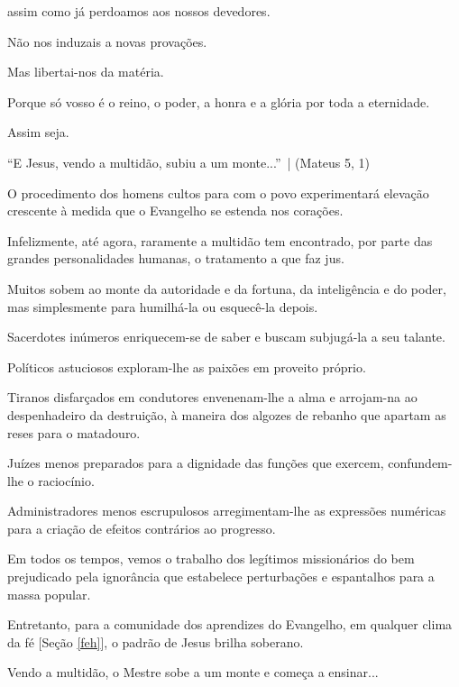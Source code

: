 \documentclass[12pt,a4paper]{article}
\begin{document}
			assim como j\'a perdoamos aos nossos devedores.

			N\~ao nos induzais a novas prova\c{c}\~oes.

			Mas libertai-nos da mat\'eria.

			Porque s\'o vosso \'e o reino, o poder, a honra e a gl\'oria por toda a eternidade.

			Assim seja.

			\begin{flushright}
			\end{flushright}

			\textquotedblleft E Jesus, vendo a multid\~ao\cite{perseguicao}, subiu a um monte...\textquotedblright\, | (Mateus 5, 1)

			O procedimento dos homens cultos para com o povo experimentar\'a eleva\c{c}\~ao crescente \`a medida que o Evangelho se estenda nos cora\c{c}\~oes.

			Infelizmente, at\'e agora, raramente a multid\~ao tem encontrado, por parte das grandes personalidades humanas, o tratamento a que faz jus.

			Muitos sobem ao monte da autoridade e da fortuna, da intelig\^encia e do poder, mas simplesmente para humilh\'a-la ou esquec\^e-la depois.

			Sacerdotes in\'umeros enriquecem-se de saber e buscam subjug\'a-la a seu talante.

			Pol\'iticos astuciosos exploram-lhe as paix\~oes em proveito pr\'oprio.

			Tiranos disfar\c{c}ados em condutores envenenam-lhe a alma e arrojam-na ao despenhadeiro da destrui\c{c}\~ao, \`a maneira dos algozes de rebanho que apartam as reses para o matadouro.

			Ju\'izes menos preparados para a dignidade das fun\c{c}\~oes que exercem, confundem-lhe o racioc\'inio.

			Administradores menos escrupulosos arregimentam-lhe as express\~oes num\'ericas para a cria\c{c}\~ao de efeitos contr\'arios ao progresso.

			Em todos os tempos, vemos o trabalho dos leg\'itimos mission\'arios do bem prejudicado pela ignor\^ancia que estabelece perturba\c{c}\~oes e espantalhos para a massa popular.

			Entretanto, para a comunidade dos aprendizes do Evangelho, em qualquer clima da f\'e [Se\c{c}\~ao \ref{feh}], o padr\~ao de Jesus brilha soberano.

			Vendo a multid\~ao, o Mestre sobe a um monte e come\c{c}a a ensinar...
\end{document}
